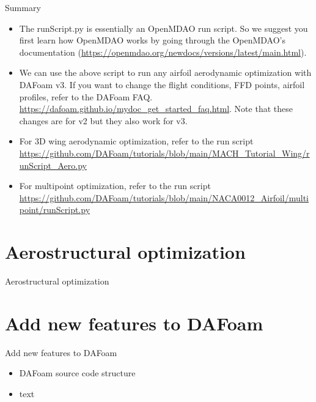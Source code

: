 \documentclass{bredelebeamer}
\begin{document}
\begin{frame}[fragile]{Summary}
    \begin{itemize}
      \setlength\itemsep{1em}
      \item The runScript.py is essentially an OpenMDAO run script. So we suggest you first learn how OpenMDAO works by going through the OpenMDAO's documentation (\url{https://openmdao.org/newdocs/versions/latest/main.html}).
     \item We can use the above script to run any airfoil aerodynamic optimization with DAFoam v3. If you want to change the flight conditions, FFD points, airfoil profiles, refer to the DAFoam FAQ. \url{https://dafoam.github.io/mydoc_get_started_faq.html}. Note that these changes are for v2 but they also work for v3.
     \item For 3D wing aerodynamic optimization, refer to the run script \url{https://github.com/DAFoam/tutorials/blob/main/MACH_Tutorial_Wing/runScript_Aero.py}
     \item For multipoint optimization, refer to the run script \url{https://github.com/DAFoam/tutorials/blob/main/NACA0012_Airfoil/multipoint/runScript.py}
    \end{itemize}
  \end{frame}
  

\section{Aerostructural optimization}
\renewcommand{\arraystretch}{2}

\begin{frame}{}
  \center \Large Aerostructural optimization
\end{frame}


\section{Add new features to DAFoam}
\renewcommand{\arraystretch}{2}

\begin{frame}{}
  \center \Large Add new features to DAFoam
  \normalsize
  \begin{itemize}
    \setlength\itemsep{1em}
    \item DAFoam source code structure
    \item text
  \end{itemize}
\end{frame}
\end{document}
